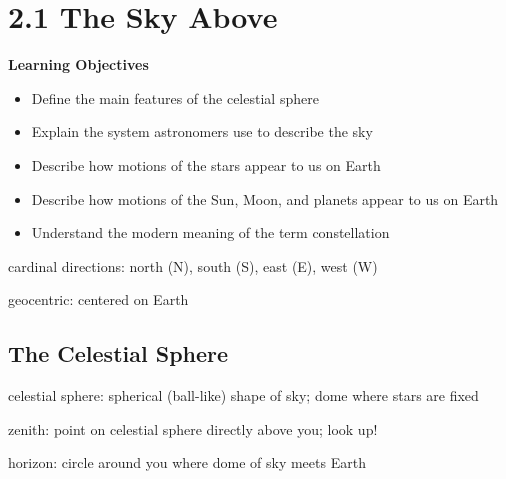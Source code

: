 \documentclass[main.tex]{subfiles}
\begin{document}
\vspace{1em}

\section*{2.1 The Sky Above}

\textbf{Learning Objectives}
\vspace{-1em}

\begin{itemize}
\setlength\itemsep{0.1ex}
    \item Define the main features of the celestial sphere
    \item Explain the system astronomers use to describe the sky
    \item Describe how motions of the stars appear to us on Earth
    \item Describe how motions of the Sun, Moon, and planets appear to us on Earth
    \item Understand the modern meaning of the term constellation
\end{itemize}

\gls{cardinal directions}: north (N), south (S), east (E), west (W)

\gls{geocentric}: centered on Earth

\subsection*{The Celestial Sphere}

\gls{celestial sphere}: spherical (ball-like) shape of sky; dome where stars are fixed


\gls{zenith}: point on celestial sphere directly above you; look up!

\gls{horizon}: circle around you where dome of sky meets Earth
\end{document}
